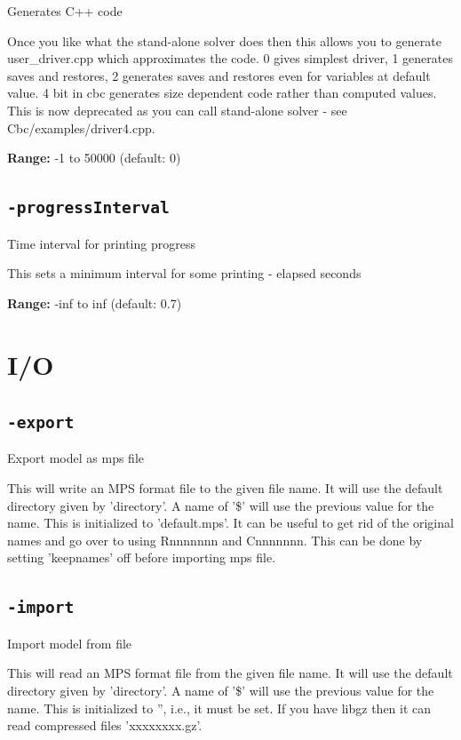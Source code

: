 \documentclass[11pt,a4paper]{article}
\begin{document}
Generates C++ code

Once you like what the stand-alone solver does then this allows you to generate user\_driver.cpp which approximates the code. 0 gives simplest driver, 1 generates saves and restores, 2 generates saves and restores even for variables at default value. 4 bit in cbc generates size dependent code rather than computed values. This is now deprecated as you can call stand-alone solver - see Cbc/examples/driver4.cpp.

\textbf{Range:} -1 to 50000 (default: 0)

\subsection*{\texttt{-progressInterval}}

Time interval for printing progress

This sets a minimum interval for some printing - elapsed seconds

\textbf{Range:} -inf to inf (default: 0.7)

\section{I/O}

\subsection*{\texttt{-export}}

Export model as mps file

This will write an MPS format file to the given file name.  It will use the default directory given by 'directory'.  A name of '\$' will use the previous value for the name.  This is initialized to 'default.mps'. It can be useful to get rid of the original names and go over to using Rnnnnnnn and Cnnnnnnn.  This can be done by setting 'keepnames' off before importing mps file.

\subsection*{\texttt{-import}}

Import model from file

This will read an MPS format file from the given file name.  It will use the default directory given by 'directory'.  A name of '\$' will use the previous value for the name.  This is initialized to '', i.e., it must be set.  If you have libgz then it can read compressed files 'xxxxxxxx.gz'.
\end{document}
